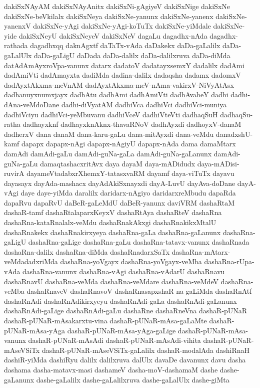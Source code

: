 {dakiSxNAyAM
dakiSxNAyAnitx
dakiSxNi-gAgiyeV
dakiSxNige
dakiSxNe
dakiSxNe-beVkilalx
dakiSxNeya
dakiSxNe-yanunx
dakiSxNe-yanenx
dakiSxNe-yanenxV
dakiSxNe-yAgi
dakiSxNe-yAgi-koTuTx
dakiSxNe-yiMdale
dakiSxNe-yide
dakiSxNeyU
dakiSxNeyeV
dakiSxNeV
dagaLu
dagadhx-nAda
dagadhx-rathada
dagadhxqq
daknAgxtf
daTaTx-vAda
daDakekx
daDa-gaLalilx
daDa-gaLalUlx
daDa-gaLigU
daDada
daDa-dalilx
daDa-dalilxruva
daDa-diMda
datAdAmAyxroVpa-vanunx
datarx
dadatoV
dadatayxsemxY
dadalilx
dadAmi
dadAmiVti
dadAmayxta
dadiMda
dadina-dalilx
dadaqsha
dadamx
dadomxV
dadAyxtAkxma-meVnAM
dadAyxtAkxma-meV-nAma-vakirxV-NiVyAtAsx
dadhanuyxnumxjayx
dadhAtu
dadhAmi
dadhAmiVti
dadhAvaheY
dadhi
dadhi-dAna-veMdoDane
dadhi-diVyatAM
dadhiVca
dadhiVci
dadhiVci-muniya
dadhiVciyu
dadhiVci-yeMbuvanu
dadhiVceV
dadhiVteVti
dadhaqSuH
dadhaqSu-ratha
dadhayxknf
dadhayxknAknx-thavaRNoV
dadhAyxdi
dadhoyxV-danaM
dadherxV
dana
danaM
dana-karu-gaLu
dana-mitAyxdi
dana-veMdu
danadxshU-kamf
dapapx
dapapx-nAgi
dapapx-nAgiyU
dapapx-nAda
dama
damaMtarx
damAdi
damAdi-gaLu
damAdi-guNa-gaLa
damAdi-guNa-gaLanunx
damAdi-guNa-gaLu
damaqtashacxritAvx
daya
dayaM
daya-mADidudx
daya-mADisi-ruvirA
dayameVtadabxrXhemxY-tatasxvaRM
dayamf
daya-viTuTx
dayavu
dayasayx
dayAda-mashacx
dayAdAkiSxnayxdi
dayA-LuvU
dayAva-doDane
dayA-vAgi
daye
daye-yiMda
daralilx
daridarx-nAgiyo
daridarxreMbudu
dapaRda
dapaRvu
dapaRvU
daBeR-gaLeMdU
daBeR-yanunx
daviVRM
dashaRtaM
dashaR-tamf
dashaRtalaparxKeyxV
dashaRtAya
dashaRteV
dashaRna
dashaRna-kataRnalalx-veMdu
dashaRnakAkxgi
dashaRnakikxMtalU
dashaRnakekx
dashaRnakirxyeya
dashaRna-gaLa
dashaRna-gaLanunx
dashaRna-gaLigU
dashaRna-gaLige
dashaRna-gaLu
dashaRna-tatavx-vanunx
dashaRnada
dashaRna-dalilx
dashaRna-diMda
dashaRnadarxSaTx
dashaRna-mAtarx-veMdadadxriMda
dashaRna-yoVgayx
dashaRna-yoVgayx-veMba
dashaRna-rUpa-vAda
dashaRna-vanunx
dashaRna-vAgi
dashaRna-vAdarU
dashaRnavu
dashaRnavU
dashaRna-veMda
dashaRna-veMdare
dashaRna-veMdeV
dashaRna-veMba
dashaRnaveV
dashaRnavoV
dashaRnasapxshaR-na-gaLiMda
dashaRnAtf
dashaRnAdi
dashaRnAdikirxyeyu
dashaRnAdi-gaLa
dashaRnAdi-gaLanunx
dashaRnAdi-gaLige
dashaRnAdi-gaLu
dashaRne
dashaRneVna
dashaR-pUNaR
dashaR-pUNaR-mAsakarxtu-vina
dashaR-pUNaR-mAsa-gaLaMte
dashaR-pUNaR-mAsa-yAga
dashaR-pUNaR-mAsa-yAga-gaLige
dashaR-pUNaR-mAsa-vanunx
dashaR-pUNaR-mAsAdi
dashaR-pUNaR-mAsAdi-vihita
dashaR-pUNaR-mAseVSiTx
dashaR-pUNaR-mAseVSiTx-gaLalilx
dashaR-modalAda
dashiRnaH
dashiR-yiMda
dashiRyu
dalilx
dalilxruva
dalUlx
davaDe
davanunx
davu
dasha
dashama
dasha-matavx-masi
dashameV
dasha-moV-dashamaM
dashe
dashe-gaLanunx
dashe-gaLalilx
dashe-gaLalilxruva
dashe-gaLalUlx
dashe-giMta
}
